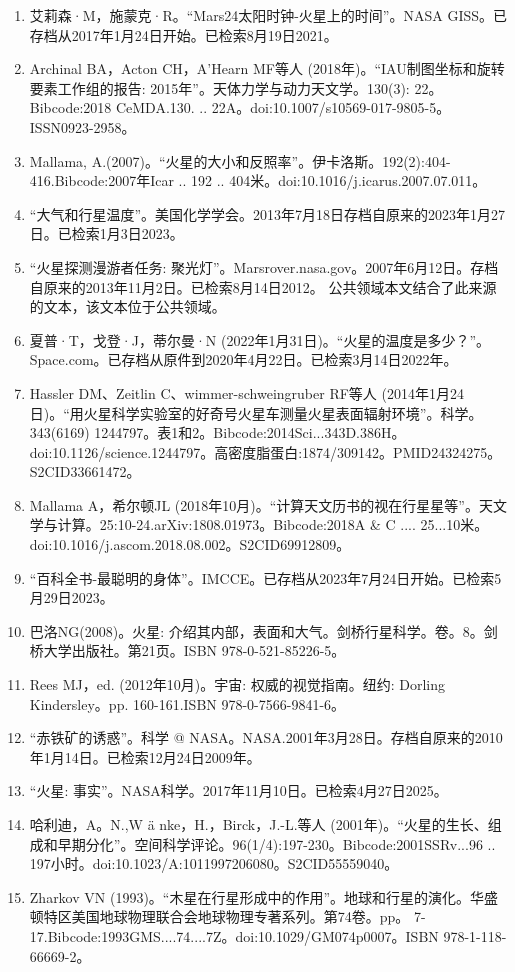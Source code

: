 \begin{enumerate}
\item 艾莉森·M，施蒙克·R。“Mars24太阳时钟-火星上的时间”。NASA GISS。已存档从2017年1月24日开始。已检索8月19日2021。
\item Archinal BA，Acton CH，A'Hearn MF等人 (2018年)。“IAU制图坐标和旋转要素工作组的报告: 2015年”。天体力学与动力天文学。130(3): 22。Bibcode:2018 CeMDA.130. .. 22A。doi:10.1007/s10569-017-9805-5。ISSN0923-2958。 
\item Mallama, A.(2007)。“火星的大小和反照率”。伊卡洛斯。192(2):404-416.Bibcode:2007年Icar .. 192 .. 404米。doi:10.1016/j.icarus.2007.07.011。
\item “大气和行星温度”。美国化学学会。2013年7月18日存档自原来的2023年1月27日。已检索1月3日2023。
\item “火星探测漫游者任务: 聚光灯”。Marsrover.nasa.gov。2007年6月12日。存档自原来的2013年11月2日。已检索8月14日2012。 公共领域本文结合了此来源的文本，该文本位于公共领域。
\item 夏普·T，戈登·J，蒂尔曼·N (2022年1月31日)。“火星的温度是多少？”。Space.com。已存档从原件到2020年4月22日。已检索3月14日2022年。
\item Hassler DM、Zeitlin C、wimmer-schweingruber RF等人 (2014年1月24日)。“用火星科学实验室的好奇号火星车测量火星表面辐射环境”。科学。343(6169) 1244797。表1和2。Bibcode:2014Sci...343D.386H。doi:10.1126/science.1244797。高密度脂蛋白:1874/309142。PMID24324275。S2CID33661472。  
\item Mallama A，希尔顿JL (2018年10月)。“计算天文历书的视在行星星等”。天文学与计算。25:10-24.arXiv:1808.01973。Bibcode:2018A & C .... 25...10米。doi:10.1016/j.ascom.2018.08.002。S2CID69912809。 
\item “百科全书-最聪明的身体”。IMCCE。已存档从2023年7月24日开始。已检索5月29日2023。
\item 巴洛NG(2008)。火星: 介绍其内部，表面和大气。剑桥行星科学。卷。8。剑桥大学出版社。第21页。ISBN 978-0-521-85226-5。
\item Rees MJ，ed. (2012年10月)。宇宙: 权威的视觉指南。纽约: Dorling Kindersley。pp. 160-161.ISBN 978-0-7566-9841-6。
\item “赤铁矿的诱惑”。科学 @ NASA。NASA.2001年3月28日。存档自原来的2010年1月14日。已检索12月24日2009年。
\item “火星: 事实”。NASA科学。2017年11月10日。已检索4月27日2025。
\item 哈利迪，A。N.,W ä nke，H.，Birck，J.-L.等人 (2001年)。“火星的生长、组成和早期分化”。空间科学评论。96(1/4):197-230。Bibcode:2001SSRv...96 .. 197小时。doi:10.1023/A:1011997206080。S2CID55559040。 
\item Zharkov VN (1993)。“木星在行星形成中的作用”。地球和行星的演化。华盛顿特区美国地球物理联合会地球物理专著系列。第74卷。pp。 7-17.Bibcode:1993GMS....74....7Z。doi:10.1029/GM074p0007。ISBN 978-1-118-66669-2。

\end{enumerate}
